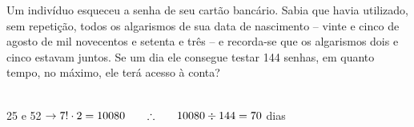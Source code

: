\begin{ex}
Um indivíduo esqueceu a senha de seu cartão bancário. Sabia que havia utilizado, sem repetição, todos os algarismos de sua data de nascimento – vinte e cinco de agosto de mil novecentos e setenta e três – e recorda-se que os algarismos dois e cinco estavam juntos. Se um dia ele consegue testar 144 senhas, em quanto tempo, no máximo, ele terá acesso à conta?
 \begin{sol}
   \phantom{A} \\
   25 e 52 $\rightarrow 7!\cdot2=10080\hspace{0,6cm}\therefore \hspace{0,6cm}10080\div144=70$ dias
 \end{sol}
\end{ex}